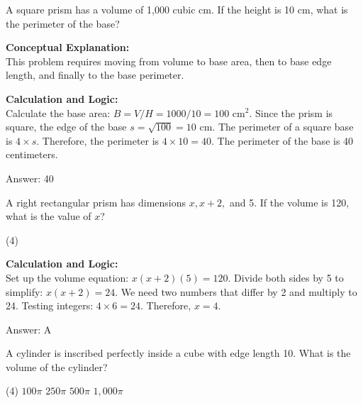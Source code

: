 \documentclass[11pt,paper=a4,answers]{exam}
\begin{document}
\begin{questions}
\vspace{60pt}

\question
A square prism has a volume of 1,000 cubic cm. If the height is 10 cm, what is the perimeter of the base?

\begin{solution}
\textbf{Conceptual Explanation:} \\
This problem requires moving from volume to base area, then to base edge length, and finally to the base perimeter.

\vspace{30pt}

\textbf{Calculation and Logic:} \\
Calculate the base area: $B = V / H = 1000 / 10 = 100 \text{ cm}^2$. Since the prism is square, the edge of the base $s = \sqrt{100} = 10$ cm. The perimeter of a square base is $4 \times s$. Therefore, the perimeter is $4 \times 10 = 40$. The perimeter of the base is 40 centimeters.

\vspace{30pt}

Answer: \colorbox{yellow!100}{40}
\end{solution}

\vspace{60pt}

\question
A right rectangular prism has dimensions $x, x+2,$ and 5. If the volume is 120, what is the value of $x$?
\begin{tasks}(4)
\end{tasks}

\begin{solution}
\textbf{Calculation and Logic:} \\
Set up the volume equation: $x(x+2)(5) = 120$. Divide both sides by 5 to simplify: $x(x+2) = 24$. We need two numbers that differ by 2 and multiply to 24. Testing integers: $4 \times 6 = 24$. Therefore, $x = 4$.

\vspace{30pt}

Answer: \colorbox{yellow!100}{A}
\end{solution}

\vspace{60pt}

\question
A cylinder is inscribed perfectly inside a cube with edge length 10. What is the volume of the cylinder?
\begin{tasks}(4)
    \task $100\pi$
    \task $250\pi$
    \task $500\pi$
    \task $1,000\pi$
\end{tasks}


\end{questions}
\end{document}
